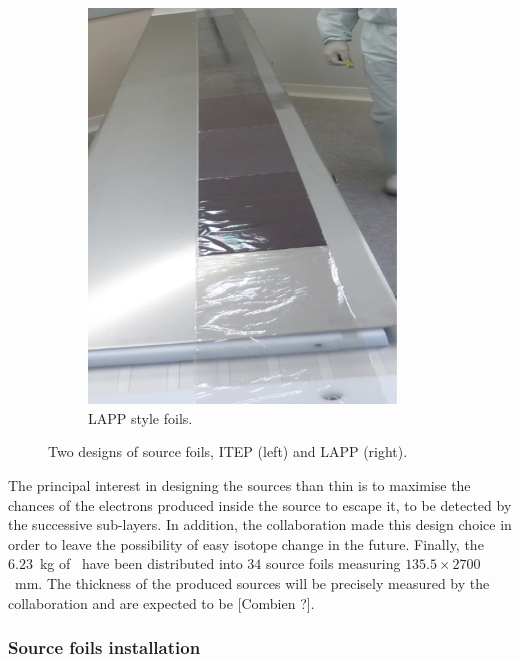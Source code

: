 \begin{figure}[h!]
\begin{subfigure}[t]{0.49\textwidth}
\centering
\includegraphics[width=0.9\textwidth]{SNdemonstrator/fig_SNdemonstrator/LAPP_source_foils.png}
\captionsetup{justification=centering}
\caption{LAPP style foils.
\label{subfig:LAPP_foils}}
\end{subfigure}
\caption{Two designs of source foils, ITEP (left) and LAPP (right).
\label{fig:foils_design}}
\end{figure}
The principal interest in designing the sources than thin is to maximise the chances of the electrons produced inside the source to escape it, to be detected by the successive sub-layers.
In addition, the collaboration made this design choice in order to leave the possibility of easy isotope change in the future.
Finally, the $6.23$~kg of \Se\ have been distributed into $34$ source foils measuring $135.5\times2700$~mm.
The thickness of the produced sources will be precisely measured by the collaboration and are expected to be [Combien ?].

\subsubsection*{Source foils installation}

